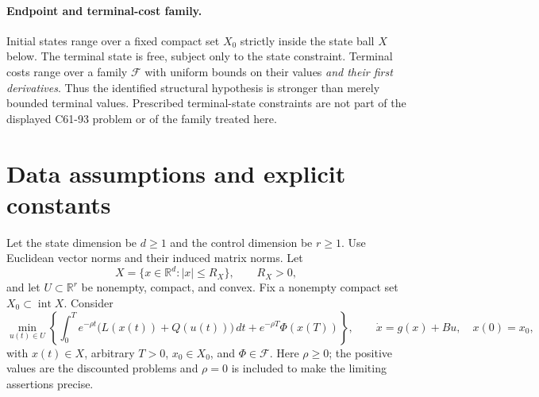 \documentclass[11pt,a4paper]{article}
\newcommand{\R}{\mathbb R}
\begin{document}
\paragraph{Endpoint and terminal-cost family.}
Initial states range over a fixed compact set $X_0$ strictly inside the
state ball $X$ below. The terminal state is free, subject only to the
state constraint. Terminal costs range over a family $\mathcal F$ with
uniform bounds on their values \emph{and their first derivatives}. Thus
the identified structural hypothesis is stronger than merely bounded
terminal values. Prescribed terminal-state constraints are not part of
the displayed C61-93 problem or of the family treated here.

\section{Data assumptions and explicit constants}
Let the state dimension be $d\geq1$ and the control dimension be $r\geq1$.
Use Euclidean vector norms and their induced matrix norms. Let
\[
 X=\{x\in\R^d:|x|\leq R_X\},\qquad R_X>0,
\]
and let $U\subset\R^r$ be nonempty, compact, and convex. Fix a nonempty
compact set $X_0\subset\operatorname{int}X$. Consider
\begin{equation}\label{eq:problem}
 \min_{u(t)\in U}\left\{
 \int_0^T e^{-\rho t}\bigl(L(x(t))+Q(u(t))\bigr)\,dt
       +e^{-\rho T}\Phi(x(T))\right\},\qquad
 \dot x=g(x)+Bu,\quad x(0)=x_0,
\end{equation}
with $x(t)\in X$, arbitrary $T>0$, $x_0\in X_0$, and $\Phi\in\mathcal F$.
Here $\rho\geq0$; the positive values are the discounted problems and
$\rho=0$ is included to make the limiting assertions precise.
\end{document}
